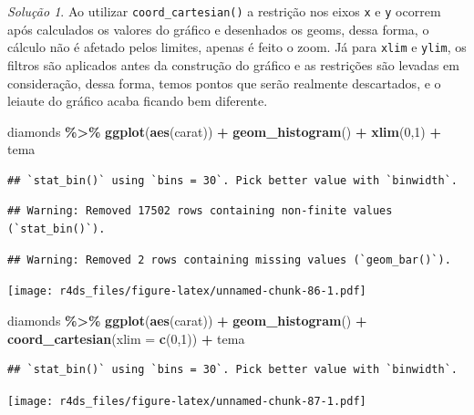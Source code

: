 \documentclass[
]{latex/krantz}
\newenvironment{Shaded}{\begin{snugshade}}{\end{snugshade}}
\newcommand{\AttributeTok}[1]{\textcolor[rgb]{0.13,0.29,0.53}{#1}}
\newcommand{\DecValTok}[1]{\textcolor[rgb]{0.00,0.00,0.81}{#1}}
\newcommand{\FunctionTok}[1]{\textcolor[rgb]{0.13,0.29,0.53}{\textbf{#1}}}
\newcommand{\NormalTok}[1]{#1}
\newcommand{\SpecialCharTok}[1]{\textcolor[rgb]{0.81,0.36,0.00}{\textbf{#1}}}
\theoremstyle{definition}
\theoremstyle{definition}
\theoremstyle{definition}
\theoremstyle{definition}
\theoremstyle{remark}
\newtheorem*{solution}{Solução}
\begin{document}
\begin{solution}
Ao utilizar \texttt{coord\_cartesian()} a restrição nos eixos \texttt{x} e \texttt{y} ocorrem após calculados os valores do gráfico e desenhados os geoms, dessa forma, o cálculo não é afetado pelos limites, apenas é feito o zoom. Já para \texttt{xlim} e \texttt{ylim}, os filtros são aplicados antes da construção do gráfico e as restrições são levadas em consideração, dessa forma, temos pontos que serão realmente descartados, e o leiaute do gráfico acaba ficando bem diferente.

\begin{Shaded}
\begin{Highlighting}[]
\NormalTok{diamonds }\SpecialCharTok{\%\textgreater{}\%}
    \FunctionTok{ggplot}\NormalTok{(}\FunctionTok{aes}\NormalTok{(carat)) }\SpecialCharTok{+}
        \FunctionTok{geom\_histogram}\NormalTok{() }\SpecialCharTok{+}
        \FunctionTok{xlim}\NormalTok{(}\DecValTok{0}\NormalTok{,}\DecValTok{1}\NormalTok{) }\SpecialCharTok{+}
\NormalTok{        tema}
\end{Highlighting}
\end{Shaded}

\begin{verbatim}
## `stat_bin()` using `bins = 30`. Pick better value with `binwidth`.
\end{verbatim}

\begin{verbatim}
## Warning: Removed 17502 rows containing non-finite values (`stat_bin()`).
\end{verbatim}

\begin{verbatim}
## Warning: Removed 2 rows containing missing values (`geom_bar()`).
\end{verbatim}

\texttt{[image: r4ds\_files/figure-latex/unnamed-chunk-86-1.pdf]}

\begin{Shaded}
\begin{Highlighting}[]
\NormalTok{diamonds }\SpecialCharTok{\%\textgreater{}\%}
    \FunctionTok{ggplot}\NormalTok{(}\FunctionTok{aes}\NormalTok{(carat)) }\SpecialCharTok{+}
        \FunctionTok{geom\_histogram}\NormalTok{() }\SpecialCharTok{+}
        \FunctionTok{coord\_cartesian}\NormalTok{(}\AttributeTok{xlim =} \FunctionTok{c}\NormalTok{(}\DecValTok{0}\NormalTok{,}\DecValTok{1}\NormalTok{)) }\SpecialCharTok{+}
\NormalTok{        tema}
\end{Highlighting}
\end{Shaded}

\begin{verbatim}
## `stat_bin()` using `bins = 30`. Pick better value with `binwidth`.
\end{verbatim}

\texttt{[image: r4ds\_files/figure-latex/unnamed-chunk-87-1.pdf]}
\end{solution}
\end{document}
